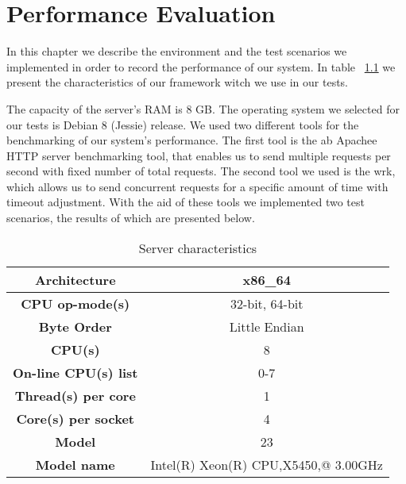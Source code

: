 \chapter{Performance Evaluation} %
\label{chapter6_pe}
In this chapter we describe the environment and the test scenarios we implemented in order to record the performance of our system. In table ~\ref{server_ch} we present the characteristics of our framework witch we use in our tests. \par 
	The capacity of the server's RAM is 8 GB. The operating system we selected for our tests is Debian 8 (Jessie) release. We used two different tools for the benchmarking of our system's performance. The first tool is the ab Apachee HTTP server benchmarking tool, that enables us to send multiple requests  per second with fixed number of total requests. The second tool we used is the wrk, which allows us to send concurrent requests for a specific amount of time with timeout adjustment. With the aid of these tools we implemented two test scenarios, the results of which are presented below. \par 


\begin{table}[]
\centering
\begin{tabular}{|c|c|}
\hline
\rowcolor[HTML]{34FF34} 
\textbf{Architecture}        & x86\_64                              \\ \hline
\rowcolor[HTML]{FFFFFF} 
\textbf{CPU op-mode(s)}      & 32-bit, 64-bit                       \\ \hline
\rowcolor[HTML]{34FF34} 
\textbf{Byte Order}          & Little Endian                        \\ \hline
\rowcolor[HTML]{FFFFFF} 
\textbf{CPU(s)}              & 8                                    \\ \hline
\rowcolor[HTML]{34FF34} 
\textbf{On-line CPU(s) list} & 0-7                                  \\ \hline
\rowcolor[HTML]{FFFFFF} 
\textbf{Thread(s) per core}  & 1                                    \\ \hline
\rowcolor[HTML]{34FF34} 
\textbf{Core(s) per socket}  & 4                                    \\ \hline
\rowcolor[HTML]{FFFFFF} 
\textbf{Model}               & 23                                   \\ \hline
\rowcolor[HTML]{34FF34} 
\textbf{Model name}          & Intel(R) Xeon(R) CPU,X5450,@ 3.00GHz \\ \hline
\end{tabular}
\caption{Server characteristics}
\label{server_ch}
\end{table}


